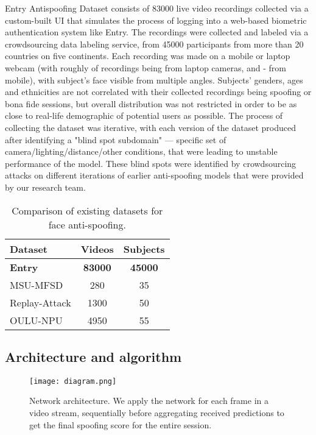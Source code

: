 \documentclass[10pt,twocolumn,letterpaper]{article}
\begin{document}
Entry Antispoofing Dataset consists of 83000 live video recordings collected via a custom-built UI that simulates the process of logging into a web-based biometric authentication system like Entry. The recordings were collected and labeled via a crowdsourcing data labeling service, from 45000 participants from more than 20 countries on five continents. 
Each recording was made on a mobile or laptop webcam (with roughly  of recordings being from laptop cameras, and  - from mobile), with subject's face visible from multiple angles. Subjects' genders, ages and ethnicities are not correlated with their collected recordings being spoofing or bona fide sessions, but overall distribution was not restricted in order to be as close to real-life demographic of potential users as possible. The process of collecting the dataset was iterative, with each version of the dataset produced after identifying a "blind spot subdomain" — specific set of camera/lighting/distance/other conditions, that were leading to unstable performance of the model. These blind spots were identified by crowdsourcing attacks on different iterations of earlier anti-spoofing models that were provided by our research team.  

\begin{table}[h]
  \centering
  \begin{tabular}{l | c | c}\toprule
    \textbf{Dataset} & \textbf{Videos} & \textbf{Subjects} \\
    \midrule
    \midrule
    \textbf{Entry} & \textbf{83000} & \textbf{45000} \\
    MSU-MFSD\cite{MFSD}      & 280  & 35 \\
    Replay-Attack\cite{mci/Chingovska2012} & 1300 & 50 \\
    OULU-NPU\cite{OULU_NPU_2017}      & 4950 & 55 \\
    \bottomrule
  \end{tabular}
  \caption{Comparison of existing datasets for face anti-spoofing.}
  \label{datasets}
\end{table}


\subsection{Architecture and algorithm}

\begin{figure}[h]
  \centering
\texttt{[image: diagram.png]}
   \caption{Network architecture. We apply the network for each frame in a video stream, sequentially before aggregating received predictions to get the final spoofing score for the entire session.}
   \label{fig:onecol}
\end{figure}
\end{document}
